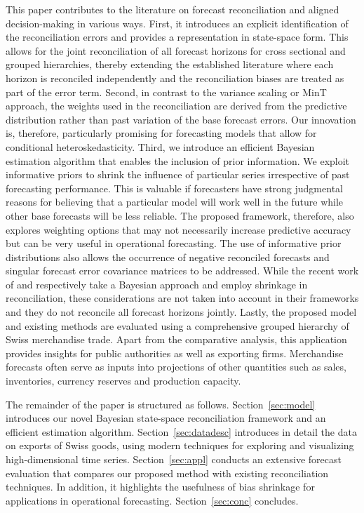 \documentclass[a4paper,fleqn,11pt]{article}
\begin{document}
This paper contributes to the literature on forecast reconciliation and aligned decision-making in various ways. First, it introduces an explicit identification of the reconciliation errors and provides a representation in state-space form. This allows for the joint reconciliation of all forecast horizons for cross sectional and grouped hierarchies, thereby extending the established literature \citep[see, for example,][]{Wickramasuriya2015} where each horizon is reconciled independently and the reconciliation biases are treated as part of the error term. Second, in contrast to the variance scaling \citep{Athanasopoulos2017} or MinT approach, the weights used in the reconciliation are derived from the predictive distribution rather than past variation of the base forecast errors. Our innovation is, therefore, particularly promising for forecasting models that allow for conditional heteroskedasticity. Third, we introduce an efficient Bayesian estimation algorithm that enables the inclusion of prior information.  We exploit informative priors to shrink the influence of particular series irrespective of past forecasting performance. This is valuable if forecasters have strong judgmental reasons for believing that a particular model will work well in the future while other base forecasts will be less reliable. The proposed framework, therefore, also explores weighting options that may not necessarily increase predictive accuracy but can be very useful in operational forecasting. The use of informative prior distributions also allows the occurrence of negative reconciled forecasts and singular forecast error covariance matrices to be addressed. While the recent work of \cite{corani2019} and \cite{bentaieb2019} respectively take a Bayesian approach and employ shrinkage in reconciliation, these considerations are not taken into account in their frameworks and they do not reconcile all forecast horizons jointly. Lastly, the proposed model and existing methods are evaluated using a comprehensive grouped hierarchy of Swiss merchandise trade. Apart from the comparative analysis, this application provides insights for public authorities as well as exporting firms. Merchandise forecasts often serve as inputs into projections of other quantities such as sales, inventories, currency reserves and production capacity.

The remainder of the paper is structured as follows. Section~\ref{sec:model} introduces our novel Bayesian state-space reconciliation framework and an efficient estimation algorithm.  Section~\ref{sec:datadesc} introduces in detail the data on exports of Swiss goods, using modern techniques for exploring and visualizing high-dimensional time series.  Section~\ref{sec:appl} conducts an extensive forecast evaluation that compares our proposed method with existing reconciliation techniques. In addition, it highlights the usefulness of bias shrinkage for applications in operational forecasting. Section~\ref{sec:conc} concludes.
\end{document}
